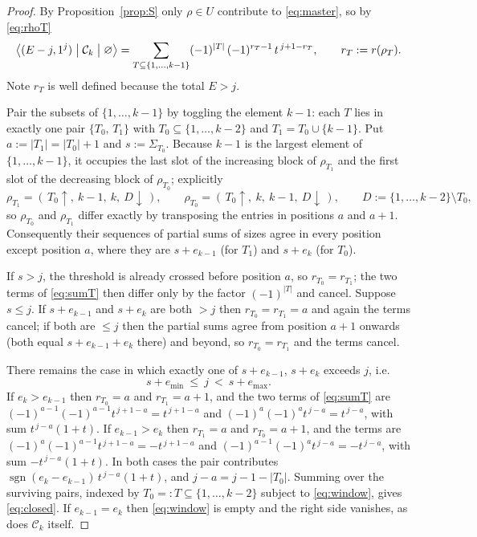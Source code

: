 \documentclass[11pt]{article}
\theoremstyle{definition}
\newcommand{\Ck}{\mathcal{C}}
\DeclareMathOperator{\sgn}{sgn}
\begin{document}
\begin{proof}
By Proposition~\ref{prop:S} only $\rho\in U$ contribute to \eqref{eq:master}, so by
\eqref{eq:rhoT}
\begin{equation}\label{eq:sumT}
  \bigl\langle (E-j,1^j)\bigm|\Ck_k\bigm|\varnothing\bigr\rangle
  =\sum_{T\subseteq\{1,\dots,k-1\}}(-1)^{|T|}\,(-1)^{r_T-1}\,t^{\,j+1-r_T},
  \qquad r_T:=r(\rho_T).
\end{equation}
Note $r_T$ is well defined because the total $E>j$.

Pair the subsets of $\{1,\dots,k-1\}$ by toggling the element $k-1$: each $T$ lies in
exactly one pair $\{T_0,\,T_1\}$ with $T_0\subseteq\{1,\dots,k-2\}$ and $T_1=T_0\cup\{k-1\}$.
Put $a:=|T_1|=|T_0|+1$ and $s:=\Sigma_{T_0}$.  Because $k-1$ is the largest element of
$\{1,\dots,k-1\}$, it occupies the last slot of the increasing block of $\rho_{T_1}$ and the
first slot of the decreasing block of $\rho_{T_0}$; explicitly
\[
  \rho_{T_1}=(\,T_0\uparrow,\ k-1,\ k,\ D\downarrow\,),\qquad
  \rho_{T_0}=(\,T_0\uparrow,\ k,\ k-1,\ D\downarrow\,),\qquad
  D:=\{1,\dots,k-2\}\setminus T_0 ,
\]
so $\rho_{T_0}$ and $\rho_{T_1}$ differ exactly by transposing the entries in positions $a$
and $a+1$.  Consequently their sequences of partial sums of sizes agree in every position
except position $a$, where they are $s+e_{k-1}$ (for $T_1$) and $s+e_k$ (for $T_0$).

If $s>j$, the threshold is already crossed before position $a$, so $r_{T_0}=r_{T_1}$; the two
terms of \eqref{eq:sumT} then differ only by the factor $(-1)^{|T|}$ and cancel.  Suppose
$s\le j$.  If $s+e_{k-1}$ and $s+e_k$ are both $>j$ then $r_{T_0}=r_{T_1}=a$ and again the
terms cancel; if both are $\le j$ then the partial sums agree from position $a+1$ onwards
(both equal $s+e_{k-1}+e_k$ there) and beyond, so $r_{T_0}=r_{T_1}$ and the terms cancel.

There remains the case in which exactly one of $s+e_{k-1}$, $s+e_k$ exceeds $j$, i.e.
\begin{equation}\label{eq:window}
  s+e_{\min}\ \le\ j\ <\ s+e_{\max}.
\end{equation}
If $e_k>e_{k-1}$ then $r_{T_0}=a$ and $r_{T_1}=a+1$, and the two terms of \eqref{eq:sumT} are
$(-1)^{a-1}(-1)^{a-1}t^{\,j+1-a}=t^{\,j+1-a}$ and $(-1)^{a}(-1)^{a}t^{\,j-a}=t^{\,j-a}$, with
sum $t^{\,j-a}(1+t)$.  If $e_{k-1}>e_k$ then $r_{T_1}=a$ and $r_{T_0}=a+1$, and the terms are
$(-1)^{a}(-1)^{a-1}t^{\,j+1-a}=-t^{\,j+1-a}$ and $(-1)^{a-1}(-1)^{a}t^{\,j-a}=-t^{\,j-a}$,
with sum $-t^{\,j-a}(1+t)$.  In both cases the pair contributes
$\sgn(e_k-e_{k-1})\,t^{\,j-a}(1+t)$, and $j-a=j-1-|T_0|$.  Summing over the surviving pairs,
indexed by $T_0=:T\subseteq\{1,\dots,k-2\}$ subject to \eqref{eq:window}, gives
\eqref{eq:closed}.  If $e_{k-1}=e_k$ then \eqref{eq:window} is empty and the right side
vanishes, as does $\Ck_k$ itself.
\end{proof}
\end{document}
